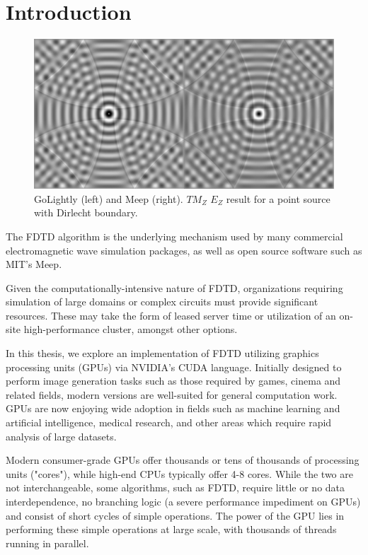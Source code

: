 \chapter{Introduction} \label{ch:introduction}

\begin{figure}[H]
	\centering
	\includegraphics[width=\textwidth,
	keepaspectratio]{point-source-comparison.jpg}
	\caption{GoLightly (left) and Meep (right). $TM_Z$ $E_Z$ result for a point source with Dirlecht boundary.}
	\label{fig:pointSourceComparison}
\end{figure}


The FDTD \cite{Yee} algorithm is the underlying mechanism used by many commercial electromagnetic wave simulation packages, as well as open source software such as MIT's Meep\cite{OskooiRo10}. 

Given the computationally-intensive nature of FDTD, organizations requiring simulation of large domains or complex circuits must provide significant resources. These may take the form of leased server time or utilization of an on-site high-performance cluster, amongst other options.

In this thesis, we explore an implementation of FDTD utilizing graphics processing units (GPUs) via NVIDIA's CUDA\cite{cuda} language. Initially designed to perform image generation tasks such as those required by games, cinema and related fields, modern versions are well-suited for general computation work. GPUs are now enjoying wide adoption in fields such as machine learning\cite{Raina09largescaledeep} and artificial intelligence\cite{wu2009clustering}, medical research\cite{QIMS1079}, and other areas which require rapid analysis of large datasets.

Modern consumer-grade GPUs offer thousands or tens of thousands of processing units ("cores"), while high-end CPUs typically offer 4-8 cores. While the two are not interchangeable, some algorithms, such as FDTD, require little or no data interdependence, no branching logic (a severe performance impediment on GPUs) and consist of short cycles of simple operations. The power of the GPU lies in performing these simple operations at large scale, with thousands of threads running in parallel. 

